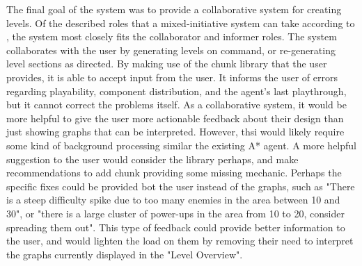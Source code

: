 The final goal of the system was to provide a collaborative system for creating levels. Of
the described roles that a mixed-initiative system can take according to \cite{lawson1997},
the system most closely fits the collaborator and informer roles. The system collaborates with
the user by generating levels on command, or re-generating level sections as directed. By
making use of the chunk library that the user provides, it is able to accept input from the user.
It informs the user of errors regarding playability, component distribution, and the agent's
last playthrough, but it cannot correct the problems itself. As a collaborative system, it
would be more helpful to give the user more actionable feedback about their design than just
showing graphs that can be interpreted. However, thsi would likely require some kind of
background processing similar the existing A* agent. A more helpful suggestion to the user
would consider the library perhaps, and make recommendations to add chunk providing some 
missing mechanic. Perhaps the specific fixes could be provided bot the user instead of the
graphs, such as "There is a steep difficulty spike due to too many enemies in the area between
10 and 30", or "there is a large cluster of power-ups in the area from 10 to 20, consider
spreading them out". This type of feedback could provide better information to the user,
and would lighten the load on them by removing their need to interpret the graphs currently
displayed in the "Level Overview".